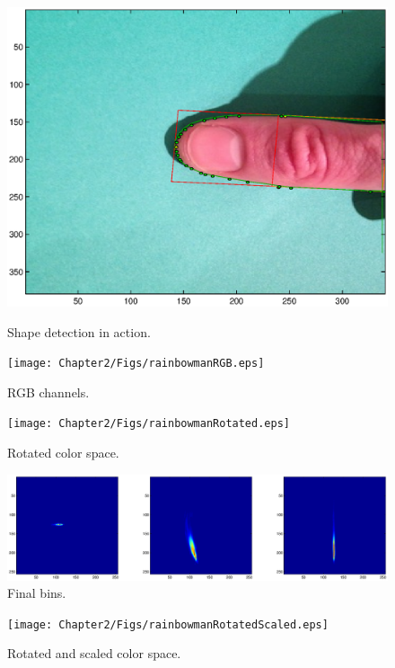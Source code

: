 \begin{figure}[h!]
  \centering
    \includegraphics[width=\textwidth]{Chapter2/Figs/shapeDetection.eps}\label{fig:shapeDetection}
    \caption{Shape detection in action.}
\end{figure}

\begin{figure}[h!]
  \centering
    \texttt{[image: Chapter2/Figs/rainbowmanRGB.eps]}
    \caption{RGB channels.}
\end{figure}

\begin{figure}[h!]
  \centering
    \texttt{[image: Chapter2/Figs/rainbowmanRotated.eps]}
    \caption{Rotated color space.}
\end{figure}

\begin{figure}[h!]
  \centering
    \includegraphics[width=\textwidth]{Chapter2/Figs/binsFinal2.eps}
    \caption{Final bins.}
\end{figure}

\begin{figure}[h!]
  \centering
    \texttt{[image: Chapter2/Figs/rainbowmanRotatedScaled.eps]}
    \caption{Rotated and scaled color space.}
\end{figure}







